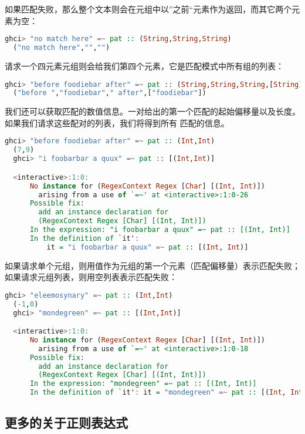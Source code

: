 \documentclass[./main.tex]{subfiles}
\begin{document}
如果匹配失败，那么整个文本则会在元组中以”之前“元素作为返回，而其它两个元素为空：

\begin{lstlisting}[language=Haskell]
  ghci> "no match here" =~ pat :: (String,String,String)
  ("no match here","","")
\end{lstlisting}

请求一个四元素元组则会给我们第四个元素，它是匹配模式中所有组的列表：

\begin{lstlisting}[language=Haskell]
  ghci> "before foodiebar after" =~ pat :: (String,String,String,[String])
  ("before ","foodiebar"," after",["foodiebar"])
\end{lstlisting}

我们还可以获取匹配的数值信息。一对给出的第一个匹配的起始偏移量以及长度。如果我们请求这些配对的列表，我们将得到所有
匹配的信息。

\begin{lstlisting}[language=Haskell]
  ghci> "before foodiebar after" =~ pat :: (Int,Int)
  (7,9)
  ghci> "i foobarbar a quux" =~ pat :: [(Int,Int)]

  <interactive>:1:0:
      No instance for (RegexContext Regex [Char] [(Int, Int)])
        arising from a use of `=~' at <interactive>:1:0-26
      Possible fix:
        add an instance declaration for
        (RegexContext Regex [Char] [(Int, Int)])
      In the expression: "i foobarbar a quux" =~ pat :: [(Int, Int)]
      In the definition of `it':
          it = "i foobarbar a quux" =~ pat :: [(Int, Int)]
\end{lstlisting}

如果请求单个元组，则用值作为元组的第一个元素（匹配偏移量）表示匹配失败；如果请求元组列表，则用空列表表示匹配失败：

\begin{lstlisting}[language=Haskell]
  ghci> "eleemosynary" =~ pat :: (Int,Int)
  (-1,0)
  ghci> "mondegreen" =~ pat :: [(Int,Int)]

  <interactive>:1:0:
      No instance for (RegexContext Regex [Char] [(Int, Int)])
        arising from a use of `=~' at <interactive>:1:0-18
      Possible fix:
        add an instance declaration for
        (RegexContext Regex [Char] [(Int, Int)])
      In the expression: "mondegreen" =~ pat :: [(Int, Int)]
      In the definition of `it': it = "mondegreen" =~ pat :: [(Int, Int)]
\end{lstlisting}

\subsection*{更多的关于正则表达式}
\end{document}
